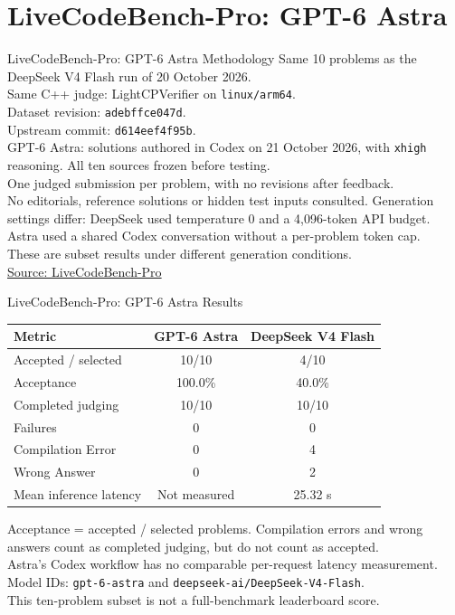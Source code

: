 \section{LiveCodeBench-Pro: GPT-6 Astra}
\begin{frame}{LiveCodeBench-Pro: GPT-6 Astra Methodology}
\small
Same 10 problems as the DeepSeek V4 Flash run of 20 October 2026.\\
Same C++ judge: LightCPVerifier on \texttt{linux/arm64}.\\
Dataset revision: \texttt{adebffce047d}.\\
Upstream commit: \texttt{d614eef4f95b}.\\[0.8em]
GPT-6 Astra: solutions authored in Codex on 21 October 2026,
with \texttt{xhigh} reasoning. All ten sources frozen before testing.\\
One judged submission per problem, with no revisions after feedback.\\
No editorials, reference solutions or hidden test inputs consulted.
\vfill\footnotesize
Generation settings differ: DeepSeek used temperature 0 and a 4,096-token API budget. Astra used a shared Codex conversation without a per-problem token cap.\\
These are subset results under different generation conditions.\\
\href{https://github.com/GavinZhengOI/LiveCodeBench-Pro}{Source: LiveCodeBench-Pro}
\end{frame}
\begin{frame}{LiveCodeBench-Pro: GPT-6 Astra Results}
\small
\begin{tabular}{lcc}\toprule
Metric & GPT-6 Astra & DeepSeek V4 Flash \\\midrule
Accepted / selected & 10/10 & 4/10 \\
Acceptance & 100.0\% & 40.0\% \\
Completed judging & 10/10 & 10/10 \\
Failures & 0 & 0 \\
Compilation Error & 0 & 4 \\
Wrong Answer & 0 & 2 \\
Mean inference latency & Not measured & 25.32 s \\
\bottomrule\end{tabular}
\vfill\footnotesize
Acceptance = accepted / selected problems. Compilation errors and wrong answers count as completed judging, but do not count as accepted.\\
Astra's Codex workflow has no comparable per-request latency measurement.\\
Model IDs: \texttt{gpt-6-astra} and \texttt{deepseek-ai/DeepSeek-V4-Flash}.\\
This ten-problem subset is not a full-benchmark leaderboard score.
\end{frame}
